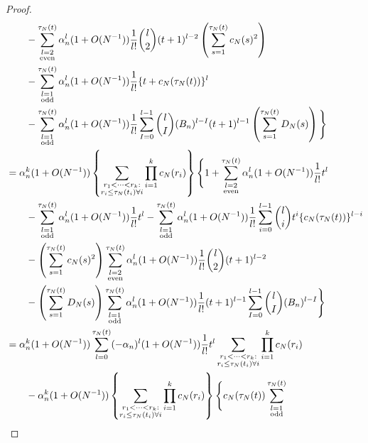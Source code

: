 \documentclass{article}
\newcommand{\1}[1]{\mathbbm{1}_{#1}}
\begin{document}
\begin{proof}
\begin{align}
&\qquad- \sum_{\substack{ l=2 \\ \text{even} }}^{\tau_N(t)}
\alpha_n^l (1 + O(N^{-1}) ) \frac{1}{l!} \binom{l}{2} (t+1)^{l-2}
\left( \sum_{s=1}^{\tau_N(t)} c_N(s)^2 \right) \notag\\
&\qquad- \sum_{\substack{ l=1 \\ \text{odd} }}^{\tau_N(t)}
\alpha_n^l (1 + O(N^{-1}) ) \frac{1}{l!}
\{ t + c_N(\tau_N(t)) \}^l \notag\\
&\qquad- \sum_{\substack{ l=1 \\ \text{odd} }}^{\tau_N(t)}
\alpha_n^l (1 + O(N^{-1}) ) \frac{1}{l!}
\sum_{I=0}^{l-1} \binom{l}{I} (B_n)^{l-I} (t+1)^{l-1}
\left( \sum_{s=1}^{\tau_N(t)} D_N(s) \right) \Bigg\} \notag\\
&= \alpha_n^k (1 + O(N^{-1}) )
\left\{ \sum_{\substack{r_1 <\dots< r_k :\\ r_i \leq \tau_N(t_i) \forall i}} \prod_{i=1}^k c_N(r_i) \right\}
\Bigg\{ 1 
+ \sum_{\substack{ l=2 \\ \text{even} }}^{\tau_N(t)} \alpha_n^l (1 + O(N^{-1}) ) \frac{1}{l!} t^l \notag\\
&\qquad- \sum_{\substack{ l=1 \\ \text{odd} }}^{\tau_N(t)} \alpha_n^l (1 + O(N^{-1}) ) \frac{1}{l!} t^l 
- \sum_{\substack{ l=1 \\ \text{odd} }}^{\tau_N(t)} \alpha_n^l (1 + O(N^{-1}) ) \frac{1}{l!}
\sum_{i=0}^{l-1} \binom{l}{i} t^i \{ c_N(\tau_N(t)) \}^{l-i} \notag\\
&\qquad- \left( \sum_{s=1}^{\tau_N(t)} c_N(s)^2 \right)
\sum_{\substack{ l=2 \\ \text{even} }}^{\tau_N(t)} \alpha_n^l (1 + O(N^{-1}) )
\frac{1}{l!} \binom{l}{2} (t+1)^{l-2} \notag\\
&\qquad- \left( \sum_{s=1}^{\tau_N(t)} D_N(s) \right)
\sum_{\substack{ l=1 \\ \text{odd} }}^{\tau_N(t)} \alpha_n^l (1 + O(N^{-1}) )\frac{1}{l!} (t+1)^{l-1}
\sum_{I=0}^{l-1} \binom{l}{I} (B_n)^{l-I} \Bigg\} \notag\\
&= \alpha_n^k (1 + O(N^{-1}) )
\sum_{l=0}^{\tau_N(t)} (- \alpha_n)^l (1 + O(N^{-1}) ) \frac{1}{l!} t^l 
\sum_{\substack{r_1 <\dots< r_k :\\ r_i \leq \tau_N(t_i) \forall i}} \prod_{i=1}^k c_N(r_i) \notag\\
&\qquad- \alpha_n^k (1 + O(N^{-1}) )
\left\{ \sum_{\substack{r_1 <\dots< r_k :\\ r_i \leq \tau_N(t_i) \forall i}} \prod_{i=1}^k c_N(r_i) \right\}
\Bigg\{ c_N(\tau_N(t)) \sum_{\substack{ l=1 \\ \text{odd} }}^{\tau_N(t)}

\end{align}
\end{proof}
\end{document}
